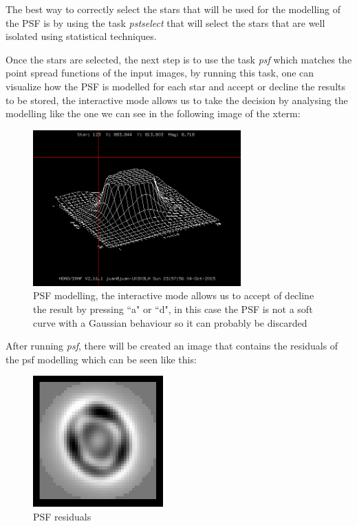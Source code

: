 The best way to correctly select the stars that will be used for the modelling of the PSF is by using the task \textit{pstselect} that will select the stars that are well isolated using statistical techniques. 

Once the stars are selected, the next step is to use the task \textit{psf} which matches the point spread functions of the input images, by running this task, one can visualize how the PSF is modelled for each star and accept or decline the results to be stored, the interactive mode allows us to take the decision by analysing the modelling like the one we can see in the following image of the xterm:

\begin{figure}[H]
\centering
\includegraphics[width=8cm]{images/psf.png}
\caption[PSF modelling]{PSF modelling, the interactive mode allows us to accept of decline the result by pressing ``a" or ``d", in this case the PSF is not a soft curve with a Gaussian behaviour so it can probably be discarded}
\end{figure}

After running \textit{psf}, there will be created an image that contains the residuals of the psf modelling which can be seen like this:

\begin{figure}[H]
\centering
\includegraphics[width=5cm]{images/psf2.png}
\caption[PSF residuals]{PSF residuals}
\end{figure}

